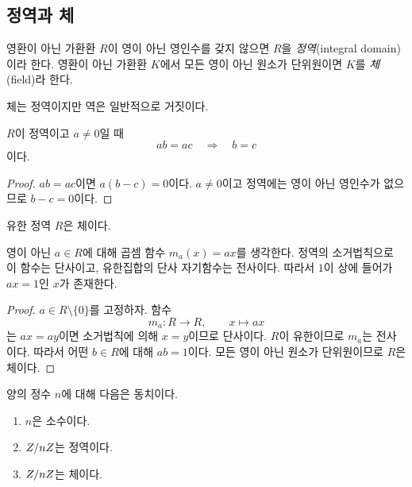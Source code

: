 \subsection{정역과 체}

\begin{definition}[정역과 체]
영환이 아닌 가환환 $R$이 영이 아닌 영인수를 갖지 않으면 $R$을 \emph{정역}(integral domain)이라 한다. 영환이 아닌 가환환 $K$에서 모든 영이 아닌 원소가 단위원이면 $K$를 \emph{체}(field)라 한다.
\end{definition}

체는 정역이지만 역은 일반적으로 거짓이다.

\begin{proposition}
$R$이 정역이고 $a\ne0$일 때
\[
  ab=ac\quad\Longrightarrow\quad b=c
\]
이다.
\end{proposition}

\begin{proof}
$ab=ac$이면 $a(b-c)=0$이다. $a\ne0$이고 정역에는 영이 아닌 영인수가 없으므로 $b-c=0$이다.
\end{proof}

\begin{theorem}[유한 정역은 체]
유한 정역 $R$은 체이다.
\end{theorem}

\begin{proofidea}
영이 아닌 $a\in R$에 대해 곱셈 함수 $m_a(x)=ax$를 생각한다. 정역의 소거법칙으로 이 함수는 단사이고, 유한집합의 단사 자기함수는 전사이다. 따라서 $1$이 상에 들어가 $ax=1$인 $x$가 존재한다.
\end{proofidea}

\begin{proof}
$a\in R\setminus\{0\}$를 고정하자. 함수
\[
  m_a:R\to R,\qquad x\mapsto ax
\]
는 $ax=ay$이면 소거법칙에 의해 $x=y$이므로 단사이다. $R$이 유한이므로 $m_a$는 전사이다. 따라서 어떤 $b\in R$에 대해 $ab=1$이다. 모든 영이 아닌 원소가 단위원이므로 $R$은 체이다.
\end{proof}

\begin{corollary}
양의 정수 $n$에 대해 다음은 동치이다.
\begin{enumerate}[label=(\roman*)]
  \item $n$은 소수이다.
  \item $Z/nZ$는 정역이다.
  \item $Z/nZ$는 체이다.
\end{enumerate}
\end{corollary}

